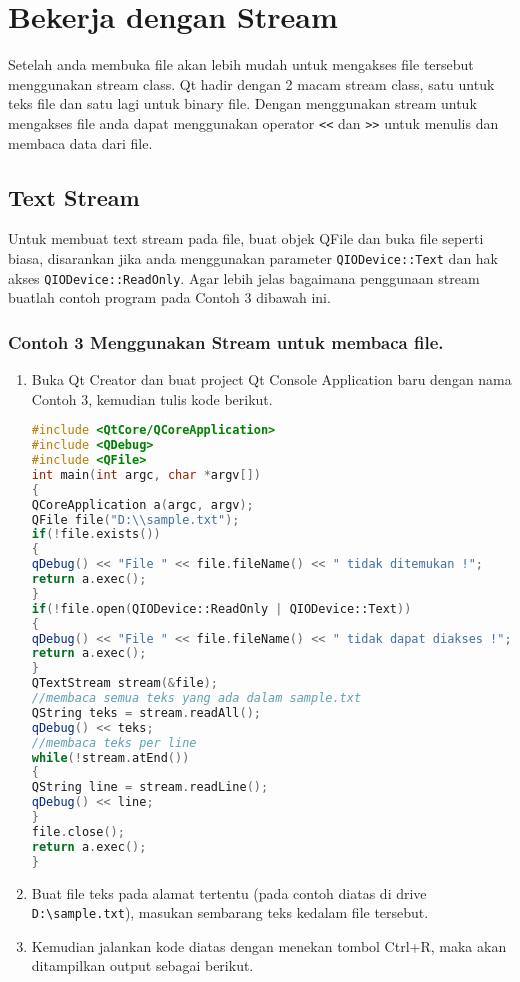\section{Bekerja dengan Stream}\label{bekerja-dengan-stream}

Setelah anda membuka file akan lebih mudah untuk mengakses file tersebut
menggunakan stream class. Qt hadir dengan 2 macam stream class, satu
untuk teks file dan satu lagi untuk binary file. Dengan menggunakan
stream untuk mengakses file anda dapat menggunakan operator
\texttt{\textless{}\textless{}} dan
\texttt{\textgreater{}\textgreater{}} untuk menulis dan membaca data
dari file.

\subsection{Text Stream}\label{text-stream}

Untuk membuat text stream pada file, buat objek QFile dan buka file
seperti biasa, disarankan jika anda menggunakan parameter
\texttt{QIODevice::Text} dan hak akses \texttt{QIODevice::ReadOnly}.
Agar lebih jelas bagaimana penggunaan stream buatlah contoh program pada
Contoh 3 dibawah ini.

\subsubsection*{Contoh 3 Menggunakan Stream untuk membaca file.}

\begin{enumerate}
\def\labelenumi{\arabic{enumi}.}
\item
  Buka Qt Creator dan buat project Qt Console Application baru dengan
  nama Contoh 3, kemudian tulis kode berikut.

\begin{lstlisting}[language=c++]
#include <QtCore/QCoreApplication>
#include <QDebug>
#include <QFile>
int main(int argc, char *argv[])
{
QCoreApplication a(argc, argv);
QFile file("D:\\sample.txt");
if(!file.exists())
{
qDebug() << "File " << file.fileName() << " tidak ditemukan !";
return a.exec();
}
if(!file.open(QIODevice::ReadOnly | QIODevice::Text))
{
qDebug() << "File " << file.fileName() << " tidak dapat diakses !";
return a.exec();
}
QTextStream stream(&file);
//membaca semua teks yang ada dalam sample.txt
QString teks = stream.readAll();
qDebug() << teks;
//membaca teks per line
while(!stream.atEnd())
{
QString line = stream.readLine();
qDebug() << line;
}
file.close();
return a.exec();
}
\end{lstlisting}
\item
  Buat file teks pada alamat tertentu (pada contoh diatas di drive
  \texttt{D:\textbackslash{}sample.txt}), masukan sembarang teks kedalam
  file tersebut.
\item
  Kemudian jalankan kode diatas dengan menekan tombol Ctrl+R, maka akan
  ditampilkan output sebagai berikut.
\end{enumerate}

